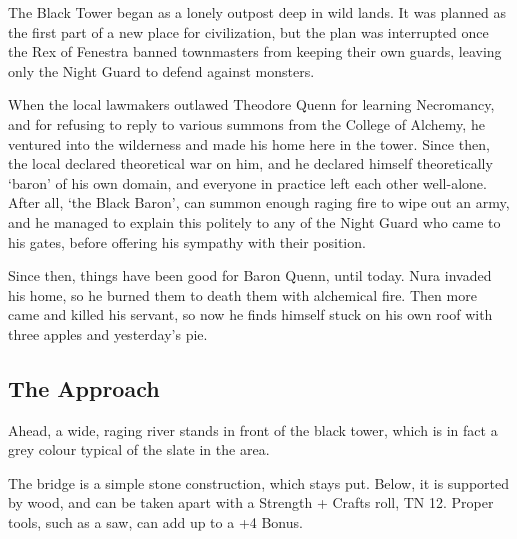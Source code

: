\begin{multicols}{2}

\begin{exampletext}

	The Black Tower began as a lonely outpost deep in wild lands.
	It was planned as the first part of a new place for civilization, but the plan was interrupted once the Rex of Fenestra banned townmasters from keeping their own guards, leaving only the Night Guard to defend against monsters.

	When the local lawmakers outlawed Theodore Quenn for learning Necromancy, and for refusing to reply to various summons from the College of Alchemy, he ventured into the wilderness and made his home here in the tower.
	Since then, the local declared theoretical war on him, and he declared himself theoretically `baron' of his own domain, and everyone in practice left each other well-alone.
	After all, `the Black Baron', can summon enough raging fire to wipe out an army, and he managed to explain this politely to any of the Night Guard who came to his gates, before offering his sympathy with their position.

	Since then, things have been good for Baron Quenn, until today.
	Nura invaded his home, so he burned them to death them with alchemical fire.
	Then more came and killed his servant, so now he finds himself stuck on his own roof with three apples and yesterday's pie.

\end{exampletext}



\subsection{The Approach}

\setcounter{list}{0}

\begin{boxtext}

	Ahead, a wide, raging river stands in front of the black tower, which is in fact a grey colour typical of the slate in the area.

\end{boxtext}


The bridge is a simple stone construction, which stays put.
Below, it is supported by wood, and can be taken apart with a Strength + Crafts roll, TN 12.
Proper tools, such as a saw, can add up to a +4 Bonus.


\end{multicols}
